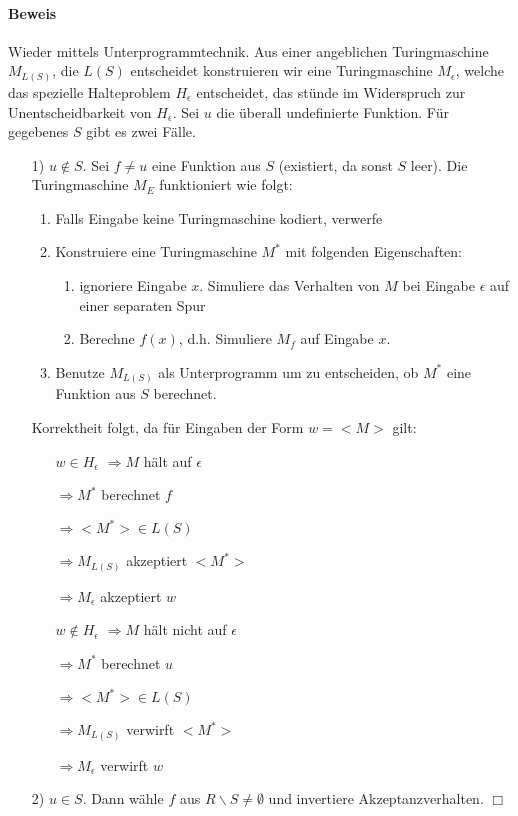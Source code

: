\paragraph*{Beweis} Wieder mittels Unterprogrammtechnik. Aus einer angeblichen Turingmaschine $M_{L(S)}$, die $L(S)$ entscheidet konstruieren wir eine Turingmaschine $M_\epsilon$, welche das spezielle Halteproblem $H_\epsilon$ entscheidet, das stünde im Widerspruch zur Unentscheidbarkeit von $H_\epsilon$. Sei $u$ die überall undefinierte Funktion. Für gegebenes $S$ gibt es zwei Fälle.
\begin{itemize}
	\item[1)] $u \not\in S$. Sei $f \not= u$ eine Funktion aus $S$ (existiert, da sonst $S$ leer). Die Turingmaschine $M_E$ funktioniert wie folgt:
	\begin{enumerate}
		\item Falls Eingabe keine Turingmaschine kodiert, verwerfe
		\item Konstruiere eine Turingmaschine $M^*$ mit folgenden Eigenschaften:
		\begin{enumerate}
			\item ignoriere Eingabe $x$. Simuliere das Verhalten von $M$ bei Eingabe $\epsilon$ auf einer separaten Spur
			\item Berechne $f(x)$, d.h. Simuliere $M_f$ auf Eingabe $x$.
		\end{enumerate}
		\item Benutze $M_{L(S)}$ als Unterprogramm um zu entscheiden, ob $M^*$ eine Funktion aus $S$ berechnet.
	\end{enumerate}
	\item[] Korrektheit folgt, da für Eingaben der Form $w=<M>$ gilt:
	\begin{itemize}
		\item[$w\in  H_\epsilon$] $\Rightarrow M$ hält auf $\epsilon$
		\item[] $\Rightarrow M^*$ berechnet $f$
		\item[] $\Rightarrow <M^*> \in L(S)$
		\item[] $\Rightarrow M_{L(S)}$ akzeptiert $<M^*>$
		\item[] $\Rightarrow M_\epsilon$ akzeptiert $w$
		\item[$w\not\in  H_\epsilon$] $\Rightarrow M$ hält nicht auf $\epsilon$
		\item[] $\Rightarrow M^*$ berechnet $u$
		\item[] $\Rightarrow <M^*> \in L(S)$
		\item[] $\Rightarrow M_{L(S)}$ verwirft $<M^*>$
		\item[] $\Rightarrow M_\epsilon$ verwirft $w$
	\end{itemize}
	\item[2)] $u \in S$. Dann wähle $f$ aus $R \backslash S \not= \emptyset$ und invertiere Akzeptanzverhalten. $\Box$
\end{itemize}

